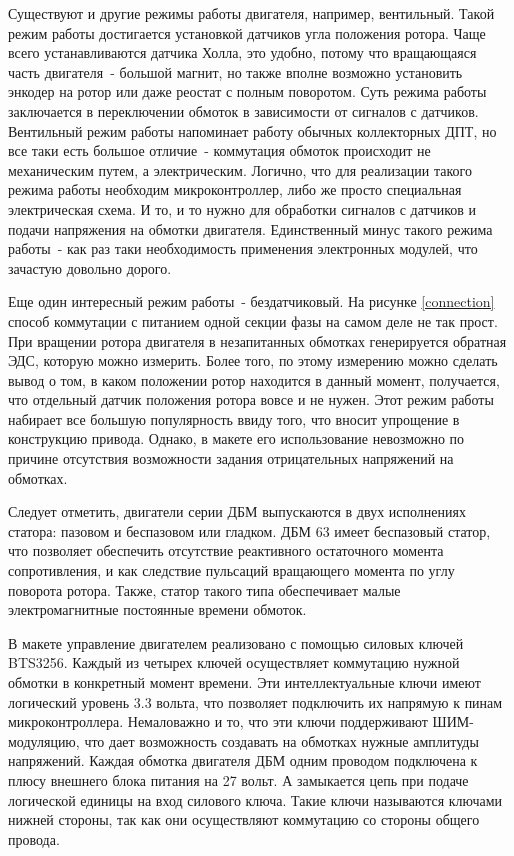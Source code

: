 Существуют и другие режимы работы двигателя, например, вентильный. Такой режим работы
достигается установкой датчиков угла положения ротора. Чаще всего устанавливаются 
датчика Холла, это удобно, потому что вращающаяся часть двигателя~- большой магнит, но также
вполне возможно установить энкодер на ротор или даже реостат с полным поворотом. Суть режима работы 
заключается в переключении обмоток в зависимости от сигналов с датчиков. Вентильный 
режим работы напоминает работу обычных коллекторных ДПТ, но все таки есть
большое отличие~- коммутация обмоток происходит не механическим путем, а электрическим.
Логично, что для реализации такого режима работы необходим микроконтроллер, либо же просто
специальная электрическая схема. И то, и то нужно для
обработки сигналов с датчиков и подачи напряжения на обмотки двигателя.
Единственный минус такого режима работы~- как раз таки необходимость
применения электронных модулей, что зачастую довольно дорого.

Еще один интересный режим работы~- бездатчиковый. На рисунке \ref{connection} способ коммутации
с питанием одной секции фазы на самом деле не так прост. При вращении ротора двигателя в 
незапитанных обмотках генерируется обратная ЭДС, которую можно измерить. 
Более того, по этому измерению можно сделать вывод о том, в каком положении ротор 
находится в данный момент, получается, что отдельный датчик положения ротора вовсе и не нужен.
Этот режим работы набирает все большую популярность ввиду того, что вносит
упрощение в конструкцию привода.
Однако, в макете его использование невозможно по причине отсутствия возможности 
задания отрицательных напряжений на обмотках.

Следует отметить, двигатели серии ДБМ выпускаются в двух исполнениях статора: 
пазовом и беспазовом или гладком. ДБМ 63 имеет беспазовый статор, что позволяет обеспечить
отсутствие реактивного остаточного момента сопротивления, и как следствие 
пульсаций вращающего момента по углу поворота ротора. Также, статор
такого типа обеспечивает малые электромагнитные постоянные времени обмоток.

В макете управление двигателем реализовано с помощью силовых ключей BTS3256. Каждый из четырех
ключей осуществляет коммутацию нужной обмотки в конкретный момент времени. Эти интеллектуальные ключи
имеют логический уровень 3.3 вольта, что позволяет подключить их напрямую к пинам микроконтроллера.
Немаловажно и то, что эти ключи поддерживают ШИМ-модуляцию, что дает возможность создавать на обмотках 
нужные амплитуды напряжений. Каждая обмотка двигателя ДБМ одним проводом подключена к плюсу внешнего 
блока питания на 27 вольт. А замыкается цепь при подаче логической единицы на вход силового ключа.
Такие ключи называются ключами нижней стороны, так как они осуществляют коммутацию со стороны общего провода.

